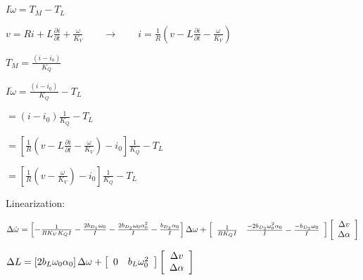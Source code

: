 \documentclass{article}%
\begin{document}
$I\dot{\omega}=T_{M}-T_{L}$

$v=Ri+L\frac{\partial i}{\partial t}+\frac{\omega}{K_{V}}\qquad\rightarrow
\qquad i=\frac{1}{R}\left(  v-L\frac{\partial i}{\partial t}-\frac{\omega
}{K_{V}}\right)  $

$T_{M}=\frac{\left(  i-i_{0}\right)  }{K_{Q}}$



$I\dot{\omega}=\frac{\left(  i-i_{0}\right)  }{K_{Q}}-T_{L}$

$=\left(  i-i_{0}\right)  \frac{1}{K_{Q}}-T_{L}$

$=\left[  \frac{1}{R}\left(  v-L\frac{\partial i}{\partial t}-\frac{\omega
}{K_{V}}\right)  -i_{0}\right]  \frac{1}{K_{Q}}-T_{L}$

$=\left[  \frac{1}{R}\left(  v-\frac{\omega}{K_{V}}\right)  -i_{0}\right]
\frac{1}{K_{Q}}-T_{L}$



Linearization:

$\Delta\dot{\omega}=\left[  -\frac{1}{RK_{V}K_{Q}I}-\frac{2b_{D_{1}}\omega
_{0}}{I}-\frac{2b_{D_{2}}\omega_{0}\alpha_{0}^{2}}{I}-\frac{b_{D_{3}}%
\alpha_{0}}{I}\right]  \Delta\omega+\left[
\begin{array}
[c]{cc}%
\frac{1}{RK_{Q}I} & \frac{-2b_{D_{2}}\omega_{0}^{2}\alpha_{0}}{I}%
-\frac{-b_{D_{3}}\omega_{0}}{I}%
\end{array}
\right]  \left[
\begin{array}
[c]{c}%
\Delta v\\
\Delta\alpha
\end{array}
\right]  $

$\Delta L=\left[  2b_{L}\omega_{0}\alpha_{0}\right]  \Delta\omega+\left[
\begin{array}
[c]{cc}%
0 & b_{L}\omega_{0}^{2}%
\end{array}
\right]  \left[
\begin{array}
[c]{c}%
\Delta v\\
\Delta\alpha
\end{array}
\right]  $
\end{document}

